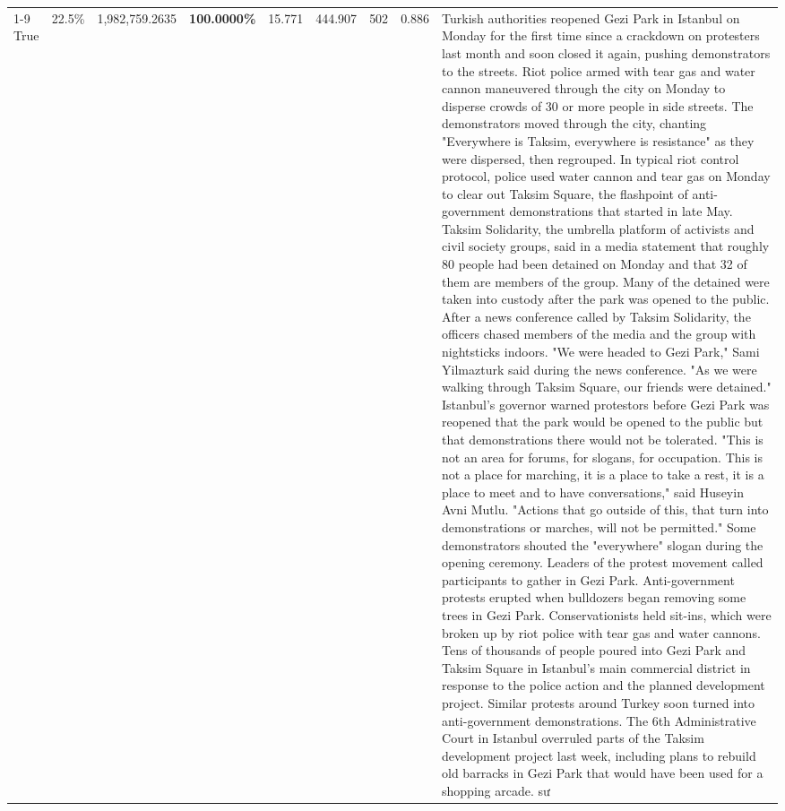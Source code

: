 \begin{table}[H]
\begin{tabular}{lllrlllll}
\cline{1-9}
True & 22.5\% & 1,982,759.2635 & \bfseries \color{red} 100.0000\% & 15.771 & 444.907 & 502 & 0.886 & Turkish authorities reopened Gezi Park in Istanbul on Monday for the first time since a crackdown on protesters last month and soon closed it again, pushing demonstrators to the streets. Riot police armed with tear gas and water cannon maneuvered through the city on Monday to disperse crowds of 30 or more people in side streets. The demonstrators moved through the city, chanting "Everywhere is Taksim, everywhere is resistance" as they were dispersed, then regrouped. In typical riot control protocol, police used water cannon and tear gas on Monday to clear out Taksim Square, the flashpoint of anti-government demonstrations that started in late May. Taksim Solidarity, the umbrella platform of activists and civil society groups, said in a media statement that roughly 80 people had been detained on Monday and that 32 of them are members of the group. Many of the detained were taken into custody after the park was opened to the public. After a news conference called by Taksim Solidarity, the officers chased members of the media and the group with nightsticks indoors. "We were headed to Gezi Park," Sami Yilmazturk said during the news conference. "As we were walking through Taksim Square, our friends were detained." Istanbul's governor warned protestors before Gezi Park was reopened that the park would be opened to the public but that demonstrations there would not be tolerated. "This is not an area for forums, for slogans, for occupation. This is not a place for marching, it is a place to take a rest, it is a place to meet and to have conversations," said Huseyin Avni Mutlu. "Actions that go outside of this, that turn into demonstrations or marches, will not be permitted." Some demonstrators shouted the "everywhere" slogan during the opening ceremony. Leaders of the protest movement called participants to gather in Gezi Park. Anti-government protests erupted when bulldozers began removing some trees in Gezi Park. Conservationists held sit-ins, which were broken up by riot police with tear gas and water cannons. Tens of thousands of people poured into Gezi Park and Taksim Square in Istanbul's main commercial district in response to the police action and the planned development project. Similar protests around Turkey soon turned into anti-government demonstrations. The 6th Administrative Court in Istanbul overruled parts of the Taksim development project last week, including plans to rebuild old barracks in Gezi Park that would have been used for a shopping arcade. sư \\

\end{tabular}
\end{table}
